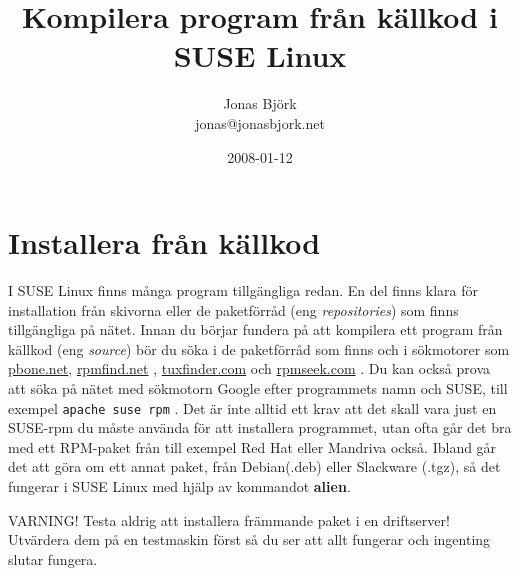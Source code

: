 \documentclass{article}
\title{Kompilera program från källkod i SUSE Linux}
\author{Jonas Björk\\ \small{jonas@jonasbjork.net}}
\date{2008-01-12}
\begin{document}
\maketitle
\setlength{\parindent}{0em}
\addtolength{\parskip}{\baselineskip}
 
\section*{Installera från källkod}
I SUSE Linux finns många program tillgängliga redan. En del finns klara för
installation från skivorna eller de paketförråd (eng \emph{repositories}) som
finns tillgängliga på nätet. Innan du börjar fundera på att kompilera ett program
från källkod (eng \emph{source}) bör du söka i de paketförråd som finns och i
sökmotorer som \href{http://rpm.pbone.net/}{pbone.net},
\href{http://rpmfind.net/}{rpmfind.net} ,
\href{http://www.tuxfinder.com/}{tuxfinder.com} och
\href{http://www.rpmseek.com/}{rpmseek.com} . Du kan också prova att söka på
nätet med sökmotorn Google efter programmets namn och SUSE, till exempel
\texttt{apache suse rpm} . Det är inte alltid ett krav att det skall vara just
en SUSE-rpm du måste använda för att installera programmet, utan ofta går det bra
med ett RPM-paket från till exempel Red Hat eller Mandriva också. Ibland går det
att göra om ett annat paket, från Debian(.deb) eller Slackware (.tgz), så det
fungerar i SUSE Linux med hjälp av kommandot \textbf{alien}. 
 
\textsf{VARNING!} Testa aldrig att installera främmande paket i en
driftserver! Utvärdera dem på en testmaskin först så du ser att allt fungerar och ingenting
slutar fungera.
\end{document}
